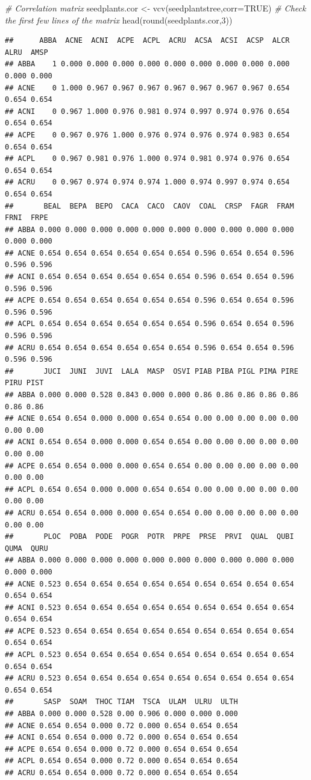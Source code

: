 \documentclass[
]{book}
\newenvironment{Shaded}{\begin{snugshade}}{\end{snugshade}}
\newcommand{\AttributeTok}[1]{\textcolor[rgb]{0.77,0.63,0.00}{#1}}
\newcommand{\CommentTok}[1]{\textcolor[rgb]{0.56,0.35,0.01}{\textit{#1}}}
\newcommand{\ConstantTok}[1]{\textcolor[rgb]{0.00,0.00,0.00}{#1}}
\newcommand{\DecValTok}[1]{\textcolor[rgb]{0.00,0.00,0.81}{#1}}
\newcommand{\FunctionTok}[1]{\textcolor[rgb]{0.00,0.00,0.00}{#1}}
\newcommand{\NormalTok}[1]{#1}
\newcommand{\OtherTok}[1]{\textcolor[rgb]{0.56,0.35,0.01}{#1}}
\begin{document}
\begin{Shaded}
\begin{Highlighting}[]
\CommentTok{\# Correlation matrix}
\NormalTok{seedplants.cor }\OtherTok{\textless{}{-}} \FunctionTok{vcv}\NormalTok{(seedplantstree,}\AttributeTok{corr=}\ConstantTok{TRUE}\NormalTok{)}
\CommentTok{\# Check the first few lines of the matrix}
\FunctionTok{head}\NormalTok{(}\FunctionTok{round}\NormalTok{(seedplants.cor,}\DecValTok{3}\NormalTok{))}
\end{Highlighting}
\end{Shaded}

\begin{verbatim}
##      ABBA  ACNE  ACNI  ACPE  ACPL  ACRU  ACSA  ACSI  ACSP  ALCR  ALRU  AMSP
## ABBA    1 0.000 0.000 0.000 0.000 0.000 0.000 0.000 0.000 0.000 0.000 0.000
## ACNE    0 1.000 0.967 0.967 0.967 0.967 0.967 0.967 0.967 0.654 0.654 0.654
## ACNI    0 0.967 1.000 0.976 0.981 0.974 0.997 0.974 0.976 0.654 0.654 0.654
## ACPE    0 0.967 0.976 1.000 0.976 0.974 0.976 0.974 0.983 0.654 0.654 0.654
## ACPL    0 0.967 0.981 0.976 1.000 0.974 0.981 0.974 0.976 0.654 0.654 0.654
## ACRU    0 0.967 0.974 0.974 0.974 1.000 0.974 0.997 0.974 0.654 0.654 0.654
##       BEAL  BEPA  BEPO  CACA  CACO  CAOV  COAL  CRSP  FAGR  FRAM  FRNI  FRPE
## ABBA 0.000 0.000 0.000 0.000 0.000 0.000 0.000 0.000 0.000 0.000 0.000 0.000
## ACNE 0.654 0.654 0.654 0.654 0.654 0.654 0.596 0.654 0.654 0.596 0.596 0.596
## ACNI 0.654 0.654 0.654 0.654 0.654 0.654 0.596 0.654 0.654 0.596 0.596 0.596
## ACPE 0.654 0.654 0.654 0.654 0.654 0.654 0.596 0.654 0.654 0.596 0.596 0.596
## ACPL 0.654 0.654 0.654 0.654 0.654 0.654 0.596 0.654 0.654 0.596 0.596 0.596
## ACRU 0.654 0.654 0.654 0.654 0.654 0.654 0.596 0.654 0.654 0.596 0.596 0.596
##       JUCI  JUNI  JUVI  LALA  MASP  OSVI PIAB PIBA PIGL PIMA PIRE PIRU PIST
## ABBA 0.000 0.000 0.528 0.843 0.000 0.000 0.86 0.86 0.86 0.86 0.86 0.86 0.86
## ACNE 0.654 0.654 0.000 0.000 0.654 0.654 0.00 0.00 0.00 0.00 0.00 0.00 0.00
## ACNI 0.654 0.654 0.000 0.000 0.654 0.654 0.00 0.00 0.00 0.00 0.00 0.00 0.00
## ACPE 0.654 0.654 0.000 0.000 0.654 0.654 0.00 0.00 0.00 0.00 0.00 0.00 0.00
## ACPL 0.654 0.654 0.000 0.000 0.654 0.654 0.00 0.00 0.00 0.00 0.00 0.00 0.00
## ACRU 0.654 0.654 0.000 0.000 0.654 0.654 0.00 0.00 0.00 0.00 0.00 0.00 0.00
##       PLOC  POBA  PODE  POGR  POTR  PRPE  PRSE  PRVI  QUAL  QUBI  QUMA  QURU
## ABBA 0.000 0.000 0.000 0.000 0.000 0.000 0.000 0.000 0.000 0.000 0.000 0.000
## ACNE 0.523 0.654 0.654 0.654 0.654 0.654 0.654 0.654 0.654 0.654 0.654 0.654
## ACNI 0.523 0.654 0.654 0.654 0.654 0.654 0.654 0.654 0.654 0.654 0.654 0.654
## ACPE 0.523 0.654 0.654 0.654 0.654 0.654 0.654 0.654 0.654 0.654 0.654 0.654
## ACPL 0.523 0.654 0.654 0.654 0.654 0.654 0.654 0.654 0.654 0.654 0.654 0.654
## ACRU 0.523 0.654 0.654 0.654 0.654 0.654 0.654 0.654 0.654 0.654 0.654 0.654
##       SASP  SOAM  THOC TIAM  TSCA  ULAM  ULRU  ULTH
## ABBA 0.000 0.000 0.528 0.00 0.906 0.000 0.000 0.000
## ACNE 0.654 0.654 0.000 0.72 0.000 0.654 0.654 0.654
## ACNI 0.654 0.654 0.000 0.72 0.000 0.654 0.654 0.654
## ACPE 0.654 0.654 0.000 0.72 0.000 0.654 0.654 0.654
## ACPL 0.654 0.654 0.000 0.72 0.000 0.654 0.654 0.654
## ACRU 0.654 0.654 0.000 0.72 0.000 0.654 0.654 0.654
\end{verbatim}
\end{document}
